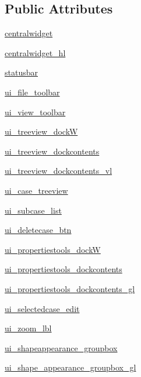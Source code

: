 \subsection*{Public Attributes}
\begin{DoxyCompactItemize}
\item 
\hyperlink{a00098_a2a323cc6e8e271345a42cb3342820d3b}{centralwidget}
\item 
\hyperlink{a00098_a84fbe4915db0698d6779bab59a55b20a}{centralwidget\+\_\+hl}
\item 
\hyperlink{a00098_a840ced767970f65402ef894fb5fcc3f3}{statusbar}
\item 
\hyperlink{a00098_aa1bd7f326134cd7873cadb8a3e89d866}{ui\+\_\+file\+\_\+toolbar}
\item 
\hyperlink{a00098_ada862a642c3a9c359564a67539047d12}{ui\+\_\+view\+\_\+toolbar}
\item 
\hyperlink{a00098_aaa6b736b767520bf24e89cfaf72ae15f}{ui\+\_\+treeview\+\_\+dockW}
\item 
\hyperlink{a00098_ae11b22f4f511169e79dd98b5e886890d}{ui\+\_\+treeview\+\_\+dockcontents}
\item 
\hyperlink{a00098_a6bf94b92513eaa3732c9dfec3f32697c}{ui\+\_\+treeview\+\_\+dockcontents\+\_\+vl}
\item 
\hyperlink{a00098_a43692c1dd9ca5ac7d3b92aefb56d3a47}{ui\+\_\+case\+\_\+treeview}
\item 
\hyperlink{a00098_ab7e73e16ab3e6b27d3d50400bc8adaa9}{ui\+\_\+subcase\+\_\+list}
\item 
\hyperlink{a00098_ab81dbfc042d78295a9c868c026846575}{ui\+\_\+deletecase\+\_\+btn}
\item 
\hyperlink{a00098_a8507133b9e49326677916d0b69587180}{ui\+\_\+propertiestools\+\_\+dockW}
\item 
\hyperlink{a00098_a26eae51ef2c81417b401501bca6ce10a}{ui\+\_\+propertiestools\+\_\+dockcontents}
\item 
\hyperlink{a00098_a83c00b5893231c0eba98a9e8e22ac09c}{ui\+\_\+propertiestools\+\_\+dockcontents\+\_\+gl}
\item 
\hyperlink{a00098_a0b802c9e05ee17be9d7fd6a867b2aa0f}{ui\+\_\+selectedcase\+\_\+edit}
\item 
\hyperlink{a00098_ab3983cab5036a720f91ae2ae62374f73}{ui\+\_\+zoom\+\_\+lbl}
\item 
\hyperlink{a00098_aa660273332cc5da8d46ae6e465323eda}{ui\+\_\+shapeappearance\+\_\+groupbox}
\item 
\hyperlink{a00098_a04a31fbb2f456070dfd32b6f122923b6}{ui\+\_\+shape\+\_\+appearance\+\_\+groupbox\+\_\+gl}

\end{DoxyCompactItemize}
